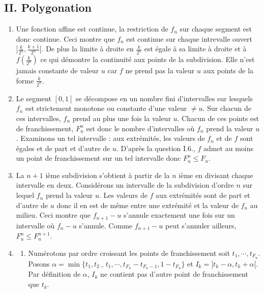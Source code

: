 \subsection*{II. Polygonation}
\begin{enumerate}
 \item Une fonction affine est continue, la restriction de $f_{n}$ sur chaque segment est donc continue. Ceci montre que $f_{n}$ est
continue sur chaque intrevalle ouvert $]\frac{k}{2^{n}},\frac{k+1}{2^{n}}[ $. De plus la limite {\`a} droite en $\frac{k}{2^{n}}$ est {\'e}gale {\`a} sa limite {\`a}
droite et {\`a} $f(\frac{k}{2^{n}})$ ce qui d{\'e}montre la continuit{\'e} aux points de la subdivision. Elle n'est jamais constante de valeur $u$ car $f$ ne prend pas la valeur $u$ aux points de la forme $\frac{k}{2^{n}}$.

  \item Le segment $[ 0,1] $ se d{\'e}compose en un nombre fini d'intervalles sur lesquels $f_{n}$ est strictement monotone ou
constante d'une valeur $\neq u$. Sur chacun de ces intervalles, $f_{n}$ prend au plus une fois la valeur $u$. Chacun de ces points est de franchissement, $F_{u}^{n}$ est donc le nombre d'intervalles o{\`u} $f_{n}$ prend la valeur $u $.\newline
Examinons un tel intervalle : aux extr{\'e}mit{\'e}s, les valeurs de $f_{n}$ et de $f$ sont {\'e}gales et de part et d'autre de $u$.
D'apr{\`e}s la question I.6., $f$ admet au moins un point de franchissement sur un tel intervalle donc $F_{u}^{n}\leq F_{u}$.

  \item La $n+1$ i{\`e}me subdivision s'obtient {\`a} partir de la $n$ i{\`e}me en divisant chaque intervalle en deux.
Consid{\'e}rons un intervalle de la subdivision d'ordre $n$ sur lequel $f_{n}$ prend la valeur $u$. Les valeurs de $f$ aux extr{\'e}mit{\'e}s sont de part et d'autre de
$u$ donc il en est de m{\^e}me entre une extr{\'e}mit{\'e} et la valeur de $f_{n} $ au milieu. Ceci montre que $f_{n+1}-u$ s'annule exactement une fois sur un intervalle o{\`u} $f_{n}-u$ s'annule.
Comme $f_{n+1}-u$ peut s'annuler ailleurs, $F_{u}^{n}\leq F_{u}^{n+1}$.

  \item
  \begin{enumerate}
    \item Num{\'e}rotons par ordre croissant les points de franchissement soit $t_{1},\cdots ,t_{F_{u}}$.
Posons $\alpha =\min \{t_{1},t_{2-}t_{1},\cdots ,t_{F_{u}}-t_{F_{u}-1},1-t_{F_{u}}\} $ et
$I_{k}=] t_{k}-\alpha ,t_{k}+\alpha [ $.
Par d{\'e}finition de $\alpha $, $I_{k}$ ne contient pas d'autre point de franchissement que $t_{k}$.


\end{enumerate}
\end{enumerate}

